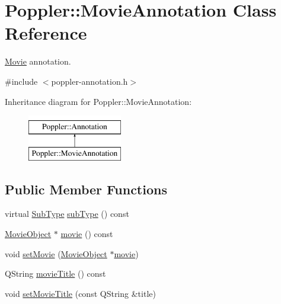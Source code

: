 \hypertarget{class_poppler_1_1_movie_annotation}{}\section{Poppler\+:\+:Movie\+Annotation Class Reference}
\label{class_poppler_1_1_movie_annotation}


\hyperlink{class_movie}{Movie} annotation.  




{\ttfamily \#include $<$poppler-\/annotation.\+h$>$}

Inheritance diagram for Poppler\+:\+:Movie\+Annotation\+:\begin{figure}[H]
\begin{center}
\leavevmode
\includegraphics[height=2.000000cm]{class_poppler_1_1_movie_annotation}
\end{center}
\end{figure}
\subsection*{Public Member Functions}
\begin{DoxyCompactItemize}
\item 
virtual \hyperlink{class_poppler_1_1_annotation_a2d592999c330949d64679cfa9e81113f}{Sub\+Type} \hyperlink{class_poppler_1_1_movie_annotation_ab4443ef588d984f52fcb93669da3e88d}{sub\+Type} () const
\item 
\hyperlink{class_poppler_1_1_movie_object}{Movie\+Object} $\ast$ \hyperlink{class_poppler_1_1_movie_annotation_a52809d1fa36ab37fe44f51e55c1c06cf}{movie} () const
\item 
void \hyperlink{class_poppler_1_1_movie_annotation_a6f7d27ddbeaa1e55dd0b41c7ed4a0eed}{set\+Movie} (\hyperlink{class_poppler_1_1_movie_object}{Movie\+Object} $\ast$\hyperlink{class_poppler_1_1_movie_annotation_a52809d1fa36ab37fe44f51e55c1c06cf}{movie})
\item 
Q\+String \hyperlink{class_poppler_1_1_movie_annotation_a89535a87130b5cfc16bd42106c79e005}{movie\+Title} () const
\item 
void \hyperlink{class_poppler_1_1_movie_annotation_a446aa7855bfe9e4bf75b795dd0dd0019}{set\+Movie\+Title} (const Q\+String \&title)
\end{DoxyCompactItemize}
